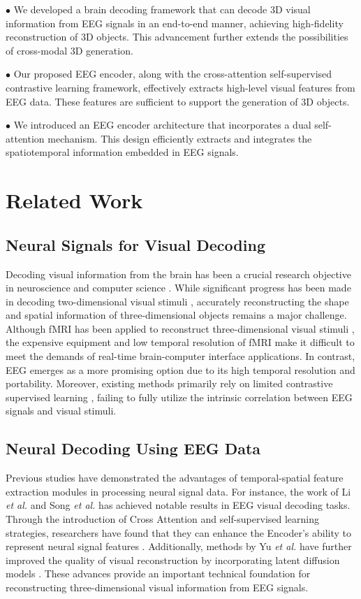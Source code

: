 \documentclass[conference]{IEEEtran}
\begin{document}
$\bullet$ We developed a brain decoding framework that can decode 3D visual information from EEG signals in an end-to-end manner, achieving high-fidelity reconstruction of 3D objects. This advancement further extends the possibilities of cross-modal 3D generation.

$\bullet$ Our proposed EEG encoder, along with the cross-attention self-supervised contrastive learning framework, effectively extracts high-level visual features from EEG data. These features are sufficient to support the generation of 3D objects.

$\bullet$ We introduced an EEG encoder architecture that incorporates a dual self-attention mechanism. This design efficiently extracts and integrates the spatiotemporal information embedded in EEG signals.


\section{Related Work}

\subsection{Neural Signals for Visual Decoding}
Decoding visual information from the brain has been a crucial research objective in neuroscience and computer science \cite{b39}. While significant progress has been made in decoding two-dimensional visual stimuli \cite{b8,b29}, accurately reconstructing the shape and spatial information of three-dimensional objects remains a major challenge. Although fMRI has been applied to reconstruct three-dimensional visual stimuli \cite{b13}, the expensive equipment and low temporal resolution of fMRI make it difficult to meet the demands of real-time brain-computer interface applications. In contrast, EEG emerges as a more promising option due to its high temporal resolution and portability. Moreover, existing methods primarily rely on limited contrastive supervised learning \cite{b29,b38}, failing to fully utilize the intrinsic correlation between EEG signals and visual stimuli.

\subsection{Neural Decoding Using EEG Data}
Previous studies have demonstrated the advantages of temporal-spatial feature extraction modules in processing neural signal data. For instance, the work of Li \textit{et al.} \cite{b29} and Song \textit{et al.} \cite{b38} has achieved notable results in EEG visual decoding tasks. Through the introduction of Cross Attention and self-supervised learning strategies, researchers have found that they can enhance the Encoder's ability to represent neural signal features \cite{b10}. Additionally, methods by Yu \textit{et al.}\cite{b8} have further improved the quality of visual reconstruction by incorporating latent diffusion models \cite{b5}. These advances provide an important technical foundation for reconstructing three-dimensional visual information from EEG signals.
\end{document}

